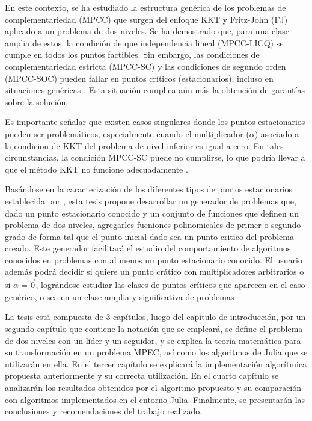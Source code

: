 En este contexto, se ha estudiado la estructura genérica de los problemas de complementariedad (MPCC) que surgen del enfoque KKT y Fritz-John (FJ) aplicado a un problema de dos niveles. Se ha demostrado que, para una clase amplia de estos, la condición de que independencia lineal (MPCC-LICQ) se cumple en todos los puntos factibles. Sin embargo, las condiciones de complementariedad estricta (MPCC-SC) y las condiciones de segundo orden (MPCC-SOC) pueden fallar en puntos críticos (estacionarios), incluso en situaciones genéricas \cite{Allende2012SolvingBP}. Esta situación complica aún más la obtención de garantías sobre la solución.

Es importante señalar que existen casos singulares donde los puntos estacionarios pueden ser problemáticos, especialmente cuando el multiplicador (\(\alpha\)) asociado a la condicion de KKT del problema de nivel inferior es igual a cero. En tales circunstancias, la condición MPCC-SC puede no cumplirse, lo que podría llevar a que el método KKT no funcione adecuadamente \cite{Allende2012SolvingBP}.

Basándose en la caracterización de los diferentes tipos de puntos estacionarios establecida por \cite{Flegel2003AFJ}, esta tesis propone desarrollar un generador de problemas que, dado un punto estacionario conocido y un conjunto de funciones que definen un problema de dos niveles, agregarles fucniones polinomicales de primer o segundo grado de forma tal que el punto inicial dado sea un punto critico del problema creado. 
Este generador facilitará el estudio del comportamiento de algoritmos conocidos en problemas con al menos un punto estacionario conocido.
El usuario además podrá decidir si quiere un punto crático con multiplicadores arbitrarios o si $\alpha = \vec{0}$, lográndose estudiar las clases de puntos críticos que aparecen en el caso genérico, o sea en un clase amplia y significativa de problemas



La tesis está compuesta de 3 capítulos, luego del capítulo de introducción, por un segundo capítulo 
que contiene la notación que se empleará, se define el problema de dos niveles con un líder y un seguidor, y se explica la teoría matemática para su transformación en un problema MPEC, así como los algoritmos de Julia que se utilizarán en ella.
En el tercer capítulo se explicará la implementación algorítmica propuesta anteriormente y su correcta utilización. 
En el cuarto capítulo se analizarán los resultados obtenidos por el algoritmo propuesto y su comparación con algoritmos implementados en el entorno Julia.
Finalmente, se presentarán las conclusiones y recomendaciones del trabajo realizado.
